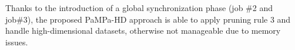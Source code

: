 %
%



Thanks to the introduction of a global synchronization phase (job \#2 and job\#3),
the proposed PaMPa-HD approach is able to apply pruning rule 3
and handle high-dimensional datasets,
otherwise not manageable due to memory issues.


